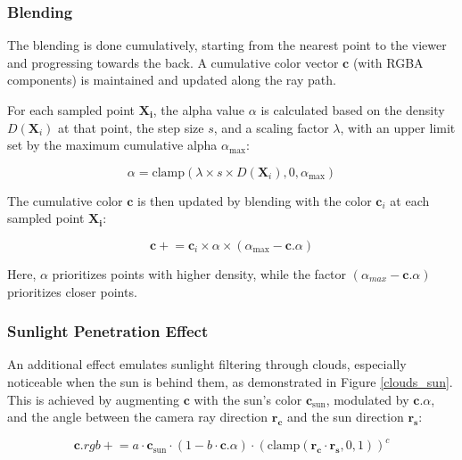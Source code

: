 \subsubsection{Blending}
\label{Cloud Blending}

The blending is done cumulatively, starting from the nearest point to the viewer and progressing towards the back. A cumulative color vector $\mathbf{c}$ (with RGBA components) is maintained and updated along the ray path.

For each sampled point $\mathbf{X_i}$, the alpha value $\alpha$ is calculated based on the density $D(\mathbf{X}_i)$ at that point, the step size $s$, and a scaling factor $\lambda$, with an upper limit set by the maximum cumulative alpha $\alpha_{\text{max}}$:

\begin{equation}
  \alpha = \text{clamp}(\lambda \times s \times D(\mathbf{X}_i), 0, \alpha_{\text{max}})
\end{equation}

The cumulative color $\mathbf{c}$ is then updated by blending with the color $\mathbf{c}_i$ at each sampled point $\mathbf{X_i}$:
  
\begin{equation}
  \mathbf{c} \mathrel{+}= \mathbf{c}_i \times \alpha \times (\alpha_{\text{max}} - \mathbf{c}.\alpha)
\end{equation}

Here, $\alpha$ prioritizes points with higher density, while the factor $(\alpha_{max} - \mathbf{c}.\alpha)$ prioritizes closer points. 


\subsubsection{Sunlight Penetration Effect}

An additional effect emulates sunlight filtering through clouds, especially noticeable when the sun is behind them, as demonstrated in Figure \ref{clouds_sun}. This is achieved by augmenting $\mathbf{c}$ with the sun's color $\mathbf{c}_{\text{sun}}$, modulated by $\mathbf{c}.\alpha$, and the angle between the camera ray direction $\mathbf{r_c}$ and the sun direction $\mathbf{r_s}$:

\begin{equation}
  \mathbf{c}.rgb \mathrel{+}= a \cdot \mathbf{c}_{\text{sun}} \cdot (1 - b \cdot \mathbf{c}.\alpha) \cdot (\text{clamp}(\mathbf{r_c} \cdot \mathbf{r_s}, 0, 1))^ c
\end{equation}


